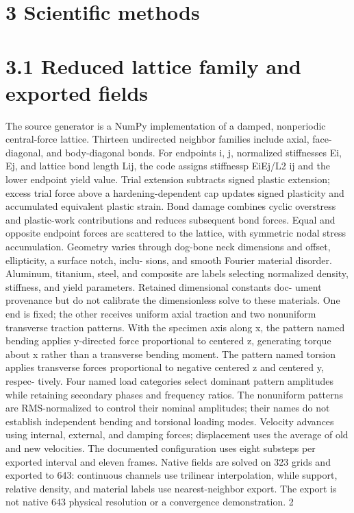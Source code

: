 \documentclass[11pt]{article}
\begin{document}
\section*{3 Scientific methods}


\section*{3.1 Reduced lattice family and exported fields}

The source generator is a NumPy implementation of a damped, nonperiodic central-force lattice.
Thirteen undirected neighbor families include axial, face-diagonal, and body-diagonal bonds. For
endpoints i, j, normalized stiffnesses Ei, Ej, and lattice bond length Lij, the code assigns stiffnessp
EiEj/L2
ij and the lower endpoint yield value. Trial extension subtracts signed plastic extension;
excess trial force above a hardening-dependent cap updates signed plasticity and accumulated
equivalent plastic strain. Bond damage combines cyclic overstress and plastic-work contributions
and reduces subsequent bond forces. Equal and opposite endpoint forces are scattered to the lattice,
with symmetric nodal stress accumulation.
Geometry varies through dog-bone neck dimensions and offset, ellipticity, a surface notch, inclu-
sions, and smooth Fourier material disorder. Aluminum, titanium, steel, and composite are labels
selecting normalized density, stiffness, and yield parameters. Retained dimensional constants doc-
ument provenance but do not calibrate the dimensionless solve to these materials. One end is
fixed; the other receives uniform axial traction and two nonuniform transverse traction patterns.
With the specimen axis along x, the pattern named bending applies y-directed force proportional
to centered z, generating torque about x rather than a transverse bending moment. The pattern
named torsion applies transverse forces proportional to negative centered z and centered y, respec-
tively. Four named load categories select dominant pattern amplitudes while retaining secondary
phases and frequency ratios. The nonuniform patterns are RMS-normalized to control their nominal
amplitudes; their names do not establish independent bending and torsional loading modes.
Velocity advances using internal, external, and damping forces; displacement uses the average of
old and new velocities. The documented configuration uses eight substeps per exported interval
and eleven frames. Native fields are solved on 323 grids and exported to 643: continuous channels
use trilinear interpolation, while support, relative density, and material labels use nearest-neighbor
export. The export is not native 643 physical resolution or a convergence demonstration.
2
\end{document}
